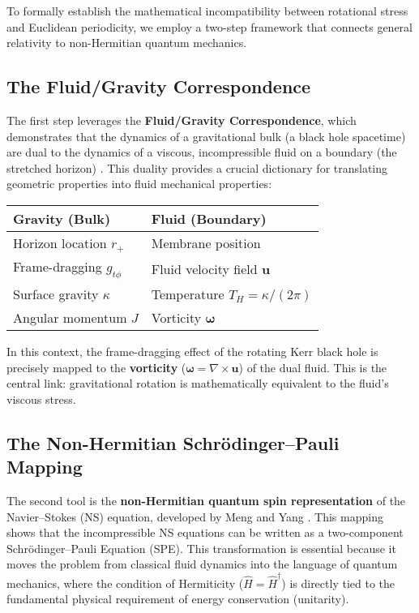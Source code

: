 \documentclass[11pt]{article}
\begin{document}
To formally establish the mathematical incompatibility between rotational stress and Euclidean periodicity, we employ a two-step framework that connects general relativity to non-Hermitian quantum mechanics.

\subsection{The Fluid/Gravity Correspondence\cite{FluidGravity2008}}

The first step leverages the \textbf{Fluid/Gravity Correspondence\cite{FluidGravity2008}}, which demonstrates that the dynamics of a gravitational bulk (a black hole spacetime) are dual to the dynamics of a viscous, incompressible fluid on a boundary (the stretched horizon) \cite{FluidGravity2008}. This duality provides a crucial dictionary for translating geometric properties into fluid mechanical properties:

\begin{center}
\begin{tabular}{|l|l|}
\hline
\textbf{Gravity (Bulk)} & \textbf{Fluid (Boundary)} \\
\hline
Horizon location $r_+$ & Membrane position \\
Frame-dragging $g_{t\phi}$ & Fluid velocity field $\mathbf{u}$ \\
Surface gravity $\kappa$ & Temperature $T_H = \kappa/(2\pi)$ \\
Angular momentum $J$ & Vorticity $\mathbf{\omega}$ \\
\hline
\end{tabular}
\end{center}

In this context, the frame-dragging effect of the rotating Kerr black hole \cite{Kerr1963} is precisely mapped to the \textbf{vorticity} ($\mathbf{\omega} = \nabla \times \mathbf{u}$) of the dual fluid. This is the central link: gravitational rotation is mathematically equivalent to the fluid's viscous stress.

\subsection{The Non-Hermitian Schrödinger--Pauli Mapping}

The second tool is the \textbf{non-Hermitian quantum spin representation} of the Navier--Stokes (NS) equation, developed by Meng and Yang \cite{MengYang2024}. This mapping shows that the incompressible NS equations can be written as a two-component Schrödinger--Pauli Equation (SPE). This transformation is essential because it moves the problem from classical fluid dynamics into the language of quantum mechanics, where the condition of Hermiticity ($\hat{H} = \hat{H}^\dagger$) is directly tied to the fundamental physical requirement of energy conservation (unitarity).
\end{document}
